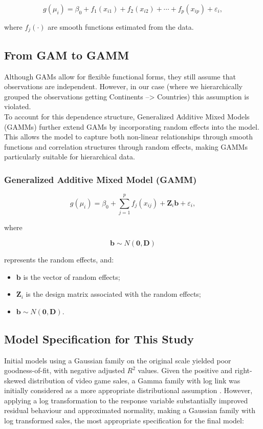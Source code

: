 \begin{equation}
g(\mu_i)=
\beta_0+
f_1(x_{i1})+
f_2(x_{i2})+
\cdots+
f_p(x_{ip}) +
\varepsilon_i,
\end{equation}

where $f_j(\cdot)$ are smooth functions estimated from the data.

\subsection{From GAM to GAMM}
Although GAMs allow for flexible functional forms, they still 
assume that observations are independent. However, in our case 
(where we hierarchically grouped the observations getting Continents --> Countries) 
this assumption is violated.\\
To account for this dependence structure, Generalized Additive 
Mixed Models (GAMMs) further extend GAMs by incorporating random
effects into the model. This allows the model to capture both 
non-linear relationships through smooth functions and correlation
structures through random effects, making GAMMs particularly 
suitable for hierarchical data.

\subsubsection{Generalized Additive Mixed Model (GAMM)}

\begin{equation}
g(\mu_i)=
\beta_0+
\sum_{j=1}^{p}f_j(x_{ij})+
\mathbf{Z}_i\mathbf{b} +
\varepsilon_i,
\end{equation}

where

\begin{equation}
\mathbf{b}\sim N(\mathbf{0},\mathbf{D})
\end{equation}

represents the random effects, and:
\begin{itemize}
    \item $\mathbf{b}$ is the vector of random effects;
    \item $\mathbf{Z}_i$ is the design matrix associated with the random effects;
    \item $\mathbf{b}\sim N(\mathbf{0},\mathbf{D})$.
\end{itemize}

\subsection{Model Specification for This Study}
Initial models using a Gaussian family on the original scale 
yielded poor goodness-of-fit, with negative adjusted $R^2$ values. 
Given the positive and right-skewed distribution of video game 
sales, a Gamma family with log link was initially considered as 
a more appropriate distributional assumption \cite{hosch2026gamma}. 
However, applying a log transformation to the response variable 
substantially improved residual behaviour and approximated 
normality, making a Gaussian family with log transformed sales, 
the most appropriate specification for the final model:

